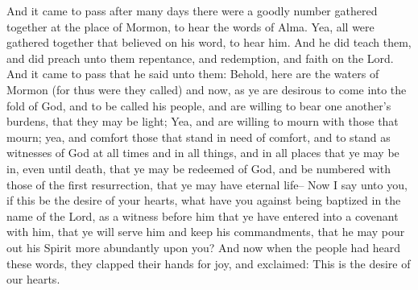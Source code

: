 And it came to pass after many days there were a goodly number gathered together at the place of Mormon, to hear the words of Alma. Yea, all were gathered together that believed on his word, to hear him. And he did teach them, and did preach unto them repentance, and redemption, and faith on the Lord.
\bverse \iffalse And it came to pass that he said unto them: Behold, here are the waters of Mormon (for thus were they called) and now, as ye are desirous to come into the fold of God, and to be called his people, and are willing to bear one another's burdens, that they may be light; \fi
And it came to pass that he said unto them: Behold, here are the waters of Mormon (for thus were they called) and now, as ye are desirous to come into the fold of God, and to be called his people, and are willing to bear one another's burdens, that they may be light;
\bverse \iffalse Yea, and are willing to mourn with those that mourn; yea, and comfort those that stand in need of comfort, and to stand as witnesses of God at all times and in all things, and in all places that ye may be in, even until death, that ye may be redeemed of God, and be numbered with those of the first resurrection, that ye may have eternal life-- \fi
Yea, and are willing to mourn with those that mourn; yea, and comfort those that stand in need of comfort, and to stand as witnesses of God at all times and in all things, and in all places that ye may be in, even until death, that ye may be redeemed of God, and be numbered with those of the first resurrection, that ye may have eternal life--
\bverse \iffalse Now I say unto you, if this be the desire of your hearts, what have you against being baptized in the name of the Lord, as a witness before him that ye have entered into a covenant with him, that ye will serve him and keep his commandments, that he may pour out his Spirit more abundantly upon you? \fi
Now I say unto you, if this be the desire of your hearts, what have you against being baptized in the name of the Lord, as a witness before him that ye have entered into a covenant with him, that ye will serve him and keep his commandments, that he may pour out his Spirit more abundantly upon you?
\bverse \iffalse And now when the people had heard these words, they clapped their hands for joy, and exclaimed: This is the desire of our hearts. \fi
And now when the people had heard these words, they clapped their hands for joy, and exclaimed: This is the desire of our hearts.
\bverse \iffalse And now it came to pass that Alma took Helam, he being one of the first, and went and stood forth in the water, and cried, saying: O Lord, pour out thy Spirit upon thy servant, that he may do this work with holiness of heart. \fi
